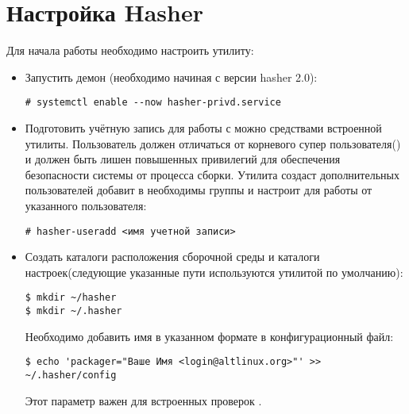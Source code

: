 \hypertarget{5.1}{\section{Настройка Hasher}}
Для начала работы необходимо настроить утилиту:
\begin{itemize}
\item Запустить демон (необходимо начиная с версии hasher 2.0):
\begin{verbatim}
# systemctl enable --now hasher-privd.service
\end{verbatim}

\item Подготовить учётную запись для работы с  можно средствами встроенной утилиты.
Пользователь должен отличаться от корневого супер пользователя() и должен быть
лишен повышенных привилегий для обеспечения безопасности системы от процесса сборки.
Утилита создаст дополнительных пользователей добавит в необходимы группы и настроит
 для работы от указанного пользователя:
\begin{verbatim}
# hasher-useradd <имя учетной записи>
\end{verbatim}

\item Создать каталоги расположения сборочной среды и каталоги настроек(следующие указанные
пути используются утилитой  по умолчанию):
\begin{verbatim}
$ mkdir ~/hasher
$ mkdir ~/.hasher
\end{verbatim}

Необходимо добавить имя в указанном формате в конфигурационный файл:
\begin{verbatim}
$ echo 'packager="Ваше Имя <login@altlinux.org>"' >> ~/.hasher/config
\end{verbatim}
Этот параметр важен для встроенных проверок .


\end{itemize}
